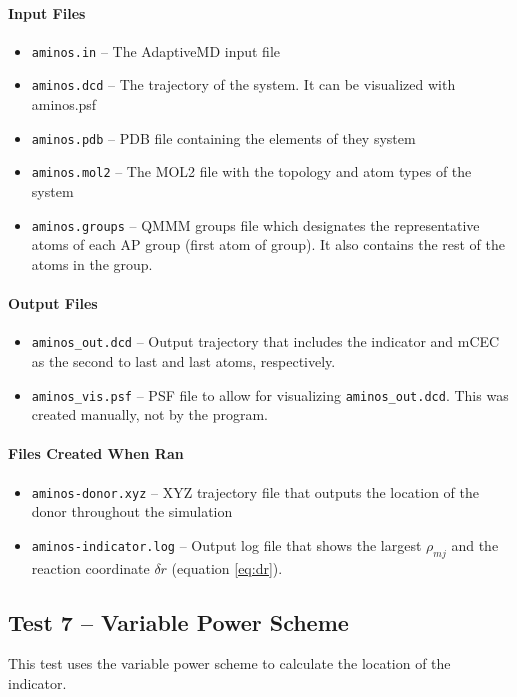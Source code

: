 \documentclass{article}
\begin{document}
\paragraph{Input Files}
\begin{itemize}
\item \texttt{aminos.in} -- The AdaptiveMD input file
\item \texttt{aminos.dcd} -- The trajectory of the system. It can be visualized with aminos.psf
\item \texttt{aminos.pdb} -- PDB file containing the elements of they system
\item \texttt{aminos.mol2} -- The MOL2 file with the topology and atom types of the system
\item \texttt{aminos.groups} -- \textsc{QMMM} groups file which designates the representative atoms of each AP group (first atom of group).
It also contains the rest of the atoms in the group.
\end{itemize}

\paragraph{Output Files}
\begin{itemize}
\item \texttt{aminos\_out.dcd} -- Output trajectory that includes the indicator and mCEC as the second to last and last atoms, respectively.
\item \texttt{aminos\_vis.psf} -- PSF file to allow for visualizing \texttt{aminos\_out.dcd}. This was created manually, not by the program.
\end{itemize}

\paragraph{Files Created When Ran}
\begin{itemize}
\item \texttt{aminos-donor.xyz} -- XYZ trajectory file that outputs the location of the donor throughout the simulation
\item \texttt{aminos-indicator.log} -- Output log file that shows the largest $\rho_{mj}$ and the reaction coordinate $\delta r$ (equation \ref{eq:dr}).
\end{itemize}

\subsection{Test 7 -- Variable Power Scheme}
This test uses the variable power scheme to calculate the location of the indicator.
\end{document}
